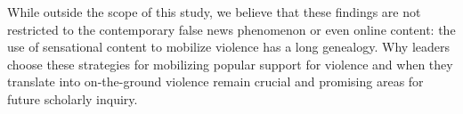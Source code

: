 While outside the scope of this study, we believe that these findings are not restricted to the contemporary false news phenomenon or even online content: the use of sensational content to mobilize violence has a long genealogy. Why leaders choose these strategies for mobilizing popular support for violence and when they translate into on-the-ground violence remain crucial and promising areas for future scholarly inquiry.


